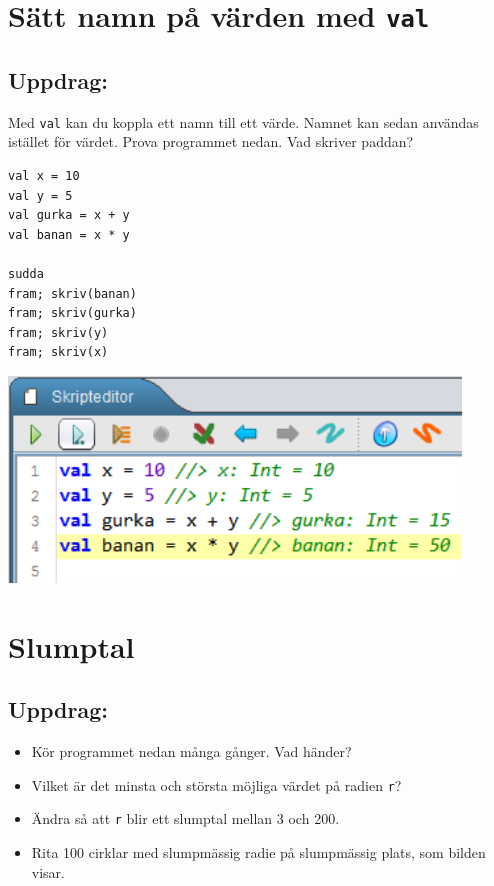 \chapter{Sätt namn på värden med \lstinline{val}}
\begin{multicols}{2}
\section*{\color{BrickRed}Uppdrag:}
Med \lstinline{val} kan du koppla ett namn till ett värde. Namnet kan sedan användas istället för värdet. Prova programmet nedan. Vad skriver paddan?

\begin{lstlisting}[numbers=none]
val x = 10
val y = 5
val gurka = x + y
val banan = x * y

sudda
fram; skriv(banan)
fram; skriv(gurka)
fram; skriv(y)
fram; skriv(x)
\end{lstlisting}
        

\columnbreak

\begin{center}
\includegraphics[width=12.0cm]{../img/val.png}
\end{center}

\end{multicols}

\chapter{Slumptal}\section*{\color{BrickRed}Uppdrag:}


\begin{itemize}

\item {Kör programmet nedan många gånger. Vad händer?}
\item {Vilket är det minsta och största möjliga värdet på radien \lstinline{r}?}
\item {Ändra så att \lstinline{r} blir ett slumptal mellan 3 och 200.}
\item {Rita 100 cirklar med slumpmässig radie på slumpmässig plats, som bilden visar.}

\end{itemize}



